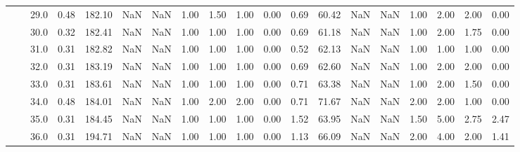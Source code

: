 \begin{tabular}{lllrrrrrrrrrrrrrrrr}
       &     & 29.0 &      0.48 &     182.10 &               NaN &                NaN &  1.00 &   1.50 &             1.00 &                         0.00 &      0.69 &      60.42 &               NaN &                NaN &  1.00 &   2.00 &             2.00 &                         0.00 \\
       &     & 30.0 &      0.32 &     182.41 &               NaN &                NaN &  1.00 &   1.00 &             1.00 &                         0.00 &      0.69 &      61.18 &               NaN &                NaN &  1.00 &   2.00 &             1.75 &                         0.00 \\
       &     & 31.0 &      0.31 &     182.82 &               NaN &                NaN &  1.00 &   1.00 &             1.00 &                         0.00 &      0.52 &      62.13 &               NaN &                NaN &  1.00 &   1.00 &             1.00 &                         0.00 \\
       &     & 32.0 &      0.31 &     183.19 &               NaN &                NaN &  1.00 &   1.00 &             1.00 &                         0.00 &      0.69 &      62.60 &               NaN &                NaN &  1.00 &   2.00 &             2.00 &                         0.00 \\
       &     & 33.0 &      0.31 &     183.61 &               NaN &                NaN &  1.00 &   1.00 &             1.00 &                         0.00 &      0.71 &      63.38 &               NaN &                NaN &  1.00 &   2.00 &             1.50 &                         0.00 \\
       &     & 34.0 &      0.48 &     184.01 &               NaN &                NaN &  1.00 &   2.00 &             2.00 &                         0.00 &      0.71 &      71.67 &               NaN &                NaN &  2.00 &   2.00 &             1.00 &                         0.00 \\
       &     & 35.0 &      0.31 &     184.45 &               NaN &                NaN &  1.00 &   1.00 &             1.00 &                         0.00 &      1.52 &      63.95 &               NaN &                NaN &  1.50 &   5.00 &             2.75 &                         2.47 \\
       &     & 36.0 &      0.31 &     194.71 &               NaN &                NaN &  1.00 &   1.00 &             1.00 &                         0.00 &      1.13 &      66.09 &               NaN &                NaN &  2.00 &   4.00 &             2.00 &                         1.41 \\

\end{tabular}
